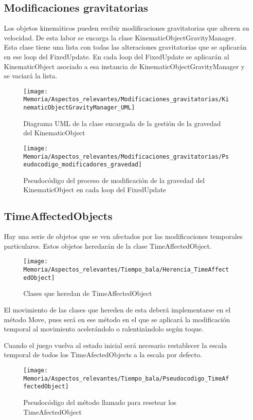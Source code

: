 \subsection{Modificaciones gravitatorias}
Los objetos kinemáticos pueden recibir modificaciones gravitatorias que alteren su velocidad. De esta labor se encarga la clase KinematicObjectGravityManager.\\
Esta clase tiene una lista con todas las alteraciones gravitatorias que se aplicarán en ese loop del FixedUpdate. En cada loop del FixedUpdate se aplicarán al KinematicObject asociado a esa instancia de KinematicObjectGravityManager y se vaciará la lista.

\begin{figure}[h]
\centering
\texttt{[image: Memoria/Aspectos\_relevantes/Modificaciones\_gravitatorias/KinematicObjectGravityManager\_UML]}
\caption{Diagrama UML de la clase encargada de la gestión de la gravedad del KinematicObject}
\end{figure}

\begin{figure}[h]
\centering
\texttt{[image: Memoria/Aspectos\_relevantes/Modificaciones\_gravitatorias/Pseudocodigo\_modificadores\_gravedad]}
\caption{Pseudocódigo del proceso de modificación de la gravedad del KinematicObject en cada loop del FixedUpdate}
\end{figure}

\subsection{TimeAffectedObjects}
Hay una serie de objetos que se ven afectados por las modificaciones temporales particulares. Estos objetos heredarán de la clase TimeAffectedObject. 

\begin{figure}[h]
\texttt{[image: Memoria/Aspectos\_relevantes/Tiempo\_bala/Herencia\_TimeAffectedObject]}
\caption{Clases que heredan de TimeAffectedObject}
\end{figure}

El movimiento de las clases que hereden de esta deberá implementarse en el método Move, pues será en ese método en el que se aplicará la modificación temporal al movimiento acelerándolo o ralentizándolo según toque.

Cuando el juego vuelva al estado inicial será necesario restablecer la escala temporal de todos los TimeAfectedObjects a la escala por defecto.

\begin{figure}[h]
\texttt{[image: Memoria/Aspectos\_relevantes/Tiempo\_bala/Pseudocodigo\_TimeAffectedObject]}
\caption{Pseudocódigo del método llamado para resetear los TimeAfectedObject}
\end{figure} 

